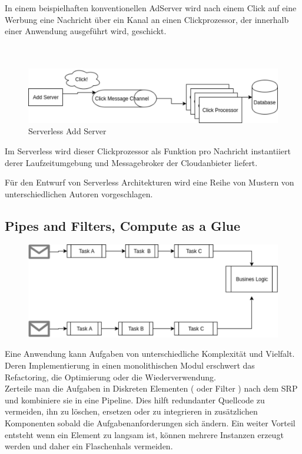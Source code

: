 \documentclass[
12pt,
english,
ngerman,
headsepline,
twoside,
openright,
numbers=noenddot,version=first
]{scrreprt}
\begin{document}
In einem beispielhaften konventionellen AdServer wird nach einem Click auf eine Werbung eine Nachricht über ein Kanal an einen Clickprozessor, der innerhalb einer Anwendung ausgeführt wird, geschickt.\\ \\ \\

\begin{figure}
	\includegraphics[scale=0.30]{./pics/serverless-example.eps}
	\caption{Serverless Add Server}
	\label{pic:serverless-add}
\end{figure}

Im Serverless wird dieser Clickprozessor als Funktion pro Nachricht instantiiert derer Laufzeitumgebung und Messagebroker der Cloudanbieter liefert. \cite{fowlerBlogServerless}
 

Für den Entwurf von Serverless Architekturen wird eine Reihe von Mustern von unterschiedlichen Autoren vorgeschlagen.\\


\subsection{Pipes and Filters, Compute as a Glue}
\label{sec:pipes-filters}
\begin{figure}
	\includegraphics[width=0.9\linewidth]{./pics/pipes-and-filters.eps}
\end{figure}
Eine Anwendung kann Aufgaben von unterschiedliche Komplexität und Vielfalt. Deren Implementierung in einen monolithischen Modul erschwert das Refactoring, die Optimierung oder die Wiederverwendung. \\
Zerteile man die Aufgaben in Diskreten Elementen ( oder Filter ) nach dem \acrshort{SRP} und kombiniere sie in eine Pipeline. Dies hilft redundanter Quellcode zu vermeiden, ihn zu löschen, ersetzen oder zu integrieren in zusätzlichen Komponenten sobald die Aufgabenanforderungen sich ändern\cite{patternsCloud}. Ein weiter Vorteil entsteht wenn ein Element zu langsam ist, können mehrere Instanzen erzeugt werden und daher ein Flaschenhals vermeiden.
\end{document}
